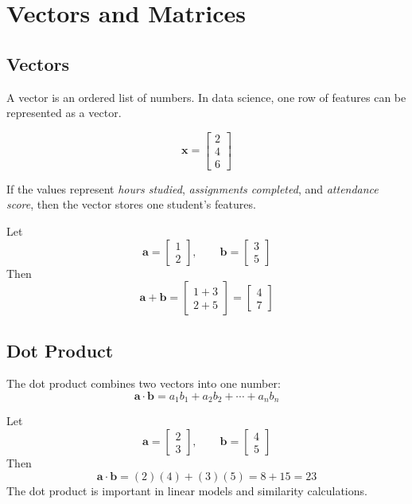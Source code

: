 \documentclass[11pt,a4paper]{article}
\begin{document}
\section{Vectors and Matrices}

\subsection{Vectors}

A vector is an ordered list of numbers. In data science, one row of features can be represented as a vector.

\[
\mathbf{x} = \begin{bmatrix} 2 \\ 4 \\ 6 \end{bmatrix}
\]

If the values represent \emph{hours studied}, \emph{assignments completed}, and \emph{attendance score}, then the vector stores one student's features.

\begin{examplebox}
Let
\[
\mathbf{a} = \begin{bmatrix} 1 \\ 2 \end{bmatrix}, \qquad
\mathbf{b} = \begin{bmatrix} 3 \\ 5 \end{bmatrix}
\]
Then
\[
\mathbf{a} + \mathbf{b} = \begin{bmatrix} 1+3 \\ 2+5 \end{bmatrix} = \begin{bmatrix} 4 \\ 7 \end{bmatrix}
\]
\end{examplebox}

\subsection{Dot Product}

The dot product combines two vectors into one number:
\[
\mathbf{a} \cdot \mathbf{b} = a_1b_1 + a_2b_2 + \cdots + a_nb_n
\]

\begin{examplebox}
Let
\[
\mathbf{a} = \begin{bmatrix} 2 \\ 3 \end{bmatrix}, \qquad
\mathbf{b} = \begin{bmatrix} 4 \\ 5 \end{bmatrix}
\]
Then
\[
\mathbf{a} \cdot \mathbf{b} = (2)(4) + (3)(5) = 8 + 15 = 23
\]
The dot product is important in linear models and similarity calculations.
\end{examplebox}
\end{document}
